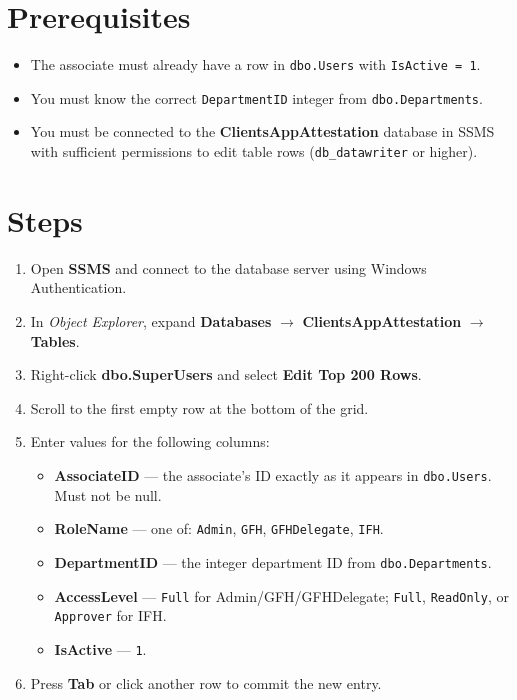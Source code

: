 \documentclass[12pt,a4paper]{report}
\begin{document}
\section{Prerequisites}

\begin{itemize}
  \item The associate must already have a row in \texttt{dbo.Users} with \texttt{IsActive = 1}.
  \item You must know the correct \texttt{DepartmentID} integer from \texttt{dbo.Departments}.
  \item You must be connected to the \textbf{ClientsAppAttestation} database in SSMS with
        sufficient permissions to edit table rows (\texttt{db\_datawriter} or higher).
\end{itemize}

\section{Steps}

\begin{enumerate}
  \item Open \textbf{SSMS} and connect to the database server using Windows Authentication.
  \item In \emph{Object Explorer}, expand \textbf{Databases} $\to$
        \textbf{ClientsAppAttestation} $\to$ \textbf{Tables}.
  \item Right-click \textbf{dbo.SuperUsers} and select \textbf{Edit Top 200 Rows}.
  \item Scroll to the first empty row at the bottom of the grid.
  \item Enter values for the following columns:
  \begin{itemize}
    \item \textbf{AssociateID} — the associate's ID exactly as it appears in
          \texttt{dbo.Users}. Must not be null.
    \item \textbf{RoleName} — one of: \texttt{Admin}, \texttt{GFH}, \texttt{GFHDelegate},
          \texttt{IFH}.
    \item \textbf{DepartmentID} — the integer department ID from \texttt{dbo.Departments}.
    \item \textbf{AccessLevel} — \texttt{Full} for Admin/GFH/GFHDelegate; \texttt{Full},
          \texttt{ReadOnly}, or \texttt{Approver} for IFH.
    \item \textbf{IsActive} — \texttt{1}.
  \end{itemize}
  \item Press \textbf{Tab} or click another row to commit the new entry.
\end{enumerate}
\end{document}
